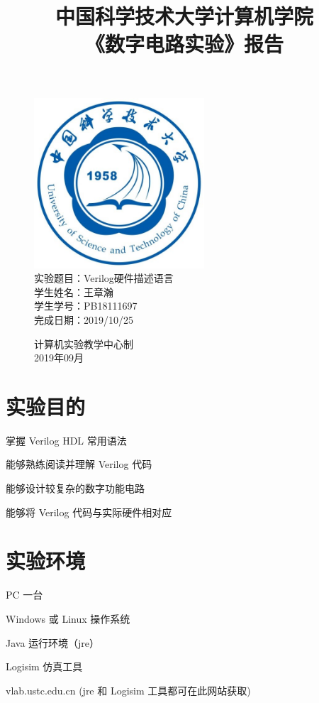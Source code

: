 \documentclass[UTF8]{article}
\title{中国科学技术大学计算机学院\\《数字电路实验》报告}
\author{}
\date{}
\begin{document}
	\maketitle
	\begin{figure}[H]
		\centering
		\includegraphics[width=2.5in]{xiaohui.jpg}\vspace{0.5cm}\\
		\large{
			实验题目：Verilog硬件描述语言\\
			学生姓名：王章瀚\\
			学生学号：PB18111697\\
			完成日期：2019/10/25\\
		}\vspace{2cm}
		
		\large{计算机实验教学中心制\\2019年09月\\}
		\thispagestyle{empty}
		\clearpage  %
	\end{figure}


	\section{实验目的}
	掌握 Verilog HDL 常用语法\par
	能够熟练阅读并理解 Verilog 代码\par
	能够设计较复杂的数字功能电路\par
	能够将 Verilog 代码与实际硬件相对应\par
	
	\section{实验环境}
	PC 一台\par
	Windows 或 Linux 操作系统\par
	Java 运行环境（jre）\par
	Logisim 仿真工具\par
	vlab.ustc.edu.cn (jre 和 Logisim 工具都可在此网站获取)\par
	
\end{document}

